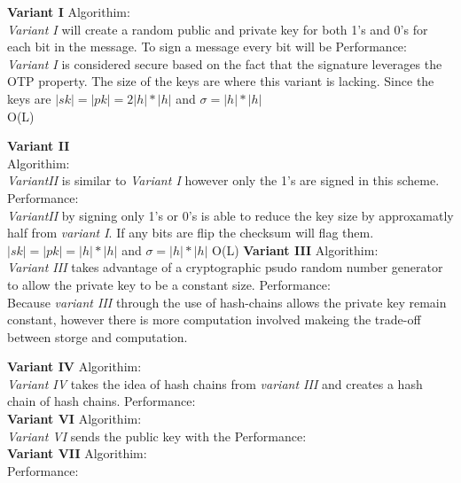 \documentclass[letterpaper,11pt,notitlepage,fleqn]{article}
\begin{document}
\noindent\textbf{Variant I}
\noindent Algorithim:\\
\indent \textit{Variant I} will create a random public and private key for both 1's and 0's for each bit in the message. To sign a message every bit will be 
\noindent Performance:\\
\indent \textit{Variant I} is considered secure based on the fact that the signature leverages the OTP property. The size of the keys are where this variant is lacking. Since the keys are $|sk|=|pk|=2|h|\ast|h|$ and $\sigma = |h|\ast|h|$ \\
O(L)

\noindent\textbf{Variant II}\\
\noindent Algorithim:\\
\indent \textit{VariantII} is similar to \textit{Variant I} however only the 1's are signed in this scheme.
\noindent Performance:\\
\indent \textit{VariantII} by signing only 1's or 0's is able to reduce the key size by approxamatly half from \textit{variant I}. If any bits are flip the checksum will flag them. $|sk|=|pk|=|h|\ast|h|$ and $\sigma = |h|\ast|h|$
O(L)
\textbf{Variant III}
\noindent Algorithim:\\
\indent\textit{Variant III} takes advantage of a cryptographic psudo random number generator to allow the private key to be a constant size. 
\noindent Performance:\\
\indent Because \textit{variant III} through the use of hash-chains allows the private key remain constant, however there is more computation involved makeing the trade-off between storge and computation. 

\textbf{Variant IV}
\noindent Algorithim:\\
\indent \textit{Variant IV} takes the idea of hash chains from \textit{variant III} and creates a hash chain of hash chains. 
\noindent Performance:\\


\textbf{Variant VI}
\noindent Algorithim:\\
\indent \textit{Variant VI} sends the public key with the 
\noindent Performance:\\

\textbf{Variant VII}
\noindent Algorithim:\\
\noindent Performance:\\
\end{document}

